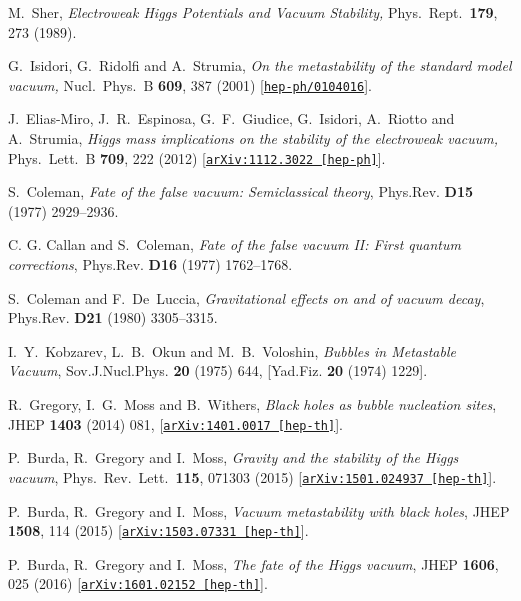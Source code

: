 \documentclass[aps,12pt,prd,superscriptaddress,preprintnumbers, 
	amssymb,
	amsmath,
	notitlepage,
	longbibliography,
	nofootinbib]{revtex4-1}
\begin{document}
\begin{thebibliography}{10}
M.~Sher,
{\it Electroweak Higgs Potentials and Vacuum Stability,}
Phys.\ Rept.\  {\bf 179}, 273 (1989).

G.~Isidori, G.~Ridolfi and A.~Strumia,
{\it On the metastability of the standard model vacuum,}
Nucl.\ Phys.\ B {\bf 609}, 387 (2001)
[\href{http://xxx.lanl.gov/abs/hep-ph/0104016}{{\tt hep-ph/0104016}}].

J.~Elias-Miro, J.~R.~Espinosa, G.~F.~Giudice, G.~Isidori, A.~Riotto and A.~Strumia,
{\it Higgs mass implications on the stability of the electroweak vacuum,}
Phys.\ Lett.\ B {\bf 709}, 222 (2012)
[\href{http://xxx.lanl.gov/abs/1112.3022}{{\tt arXiv:1112.3022 [hep-ph]}}].

S.~Coleman, 
{\it {Fate of the false vacuum: Semiclassical theory}},  
Phys.Rev. {\bf D15} (1977) 2929--2936.

C. G. Callan and S.~Coleman,
{\it {Fate of the false vacuum II: First quantum corrections}},  
Phys.Rev. {\bf D16} (1977) 1762--1768.

S.~Coleman and F.~De~Luccia, 
{\it {Gravitational effects on and of vacuum decay}},  
Phys.Rev. {\bf D21} (1980) 3305--3315.

I.~Y.~Kobzarev, L.~B.~Okun and M.~B.~Voloshin,
{\it {Bubbles in Metastable Vacuum}},  
Sov.J.Nucl.Phys. {\bf 20} (1975) 644,
[Yad.Fiz. {\bf 20} (1974) 1229].

R.~Gregory, I.~G.~Moss and B.~Withers,
{\it {Black holes as bubble nucleation sites}},  
JHEP {\bf 1403} (2014) 081,
[\href{http://xxx.lanl.gov/abs/1401.0017}{{\tt arXiv:1401.0017 [hep-th]}}].

P.~Burda, R.~Gregory and I.~Moss,
{\it Gravity and the stability of the Higgs vacuum},
Phys.\ Rev.\ Lett.\  {\bf 115}, 071303 (2015)
[\href{http://xxx.lanl.gov/abs/1501.04937}{{\tt arXiv:1501.024937 [hep-th]}}].

P.~Burda, R.~Gregory and I.~Moss,
{\it Vacuum metastability with black holes},
JHEP {\bf 1508}, 114 (2015)
[\href{http://xxx.lanl.gov/abs/1503.07331}{{\tt arXiv:1503.07331 [hep-th]}}].

P.~Burda, R.~Gregory and I.~Moss,
{\it The fate of the Higgs vacuum},
JHEP {\bf 1606}, 025 (2016)
[\href{http://xxx.lanl.gov/abs/1601.02152}{{\tt arXiv:1601.02152 [hep-th]}}].


\end{thebibliography}
\end{document}
